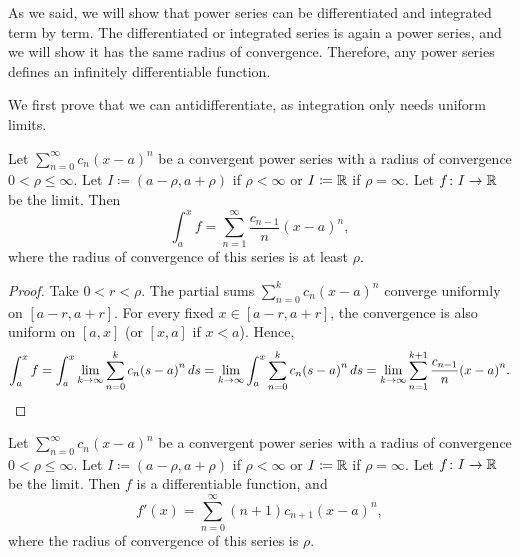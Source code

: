 As we said, we will show that
power series can be differentiated and integrated
term by term.  The 
differentiated or integrated series is again a power series,
and we will show it has the same radius of convergence.
Therefore, 
any power series defines an infinitely differentiable function.

We first prove that we can antidifferentiate, as integration only needs
uniform limits.

\begin{cor}
Let $\sum_{n=0}^\infty c_n {(x-a)}^n$ be a convergent power series with a radius
of convergence $0 < \rho \leq \infty$.
Let $I \coloneqq (a-\rho,a+\rho)$ if $\rho < \infty$
or $I \coloneqq {\mathbb{R}}$ if $\rho= \infty$.  Let $f \colon I \to {\mathbb{R}}$ be the limit.
Then
\begin{equation*}
\int_a^x f = \sum_{n=1}^\infty \frac{c_{n-1}}{n} {(x-a)}^{n} ,
\end{equation*}
where the radius of convergence of this series is at least $\rho$.
\end{cor}

\begin{proof}
Take $0 < r < \rho$.
The partial sums $\sum_{n=0}^k c_n {(x-a)}^n$ converge uniformly on $[a-r,a+r]$.
For every fixed $x \in [a-r,a+r]$, the convergence is also uniform
on $[a,x]$ (or $[x,a]$ if $x < a$).
Hence,
\begin{equation*}
\int_a^x f =
\int_a^x \lim_{k\to\infty} \sum_{n=0}^k c_n {(s-a)}^n \, ds
=
\lim_{k\to\infty}
\int_a^x \sum_{n=0}^k c_n {(s-a)}^n \, ds
=
\lim_{k\to\infty}
\sum_{n=1}^{k+1} \frac{c_{n-1}}{n} {(x-a)}^{n} . \qedhere
\end{equation*}
\end{proof}


\begin{cor} \label{cor:differentiatepowerser}
Let $\sum_{n=0}^\infty c_n {(x-a)}^n$ be a convergent power series with a radius
of convergence $0 < \rho \leq \infty$.
Let $I \coloneqq (a-\rho,a+\rho)$ if $\rho < \infty$
or $I \coloneqq {\mathbb{R}}$ if $\rho= \infty$.  Let $f \colon I \to {\mathbb{R}}$ be the limit.
Then $f$ is a differentiable function, and
\begin{equation*}
f'(x) = \sum_{n=0}^\infty (n+1) c_{n+1} {(x-a)}^{n} ,
\end{equation*}
where the radius of convergence of this series is $\rho$.
\end{cor}

